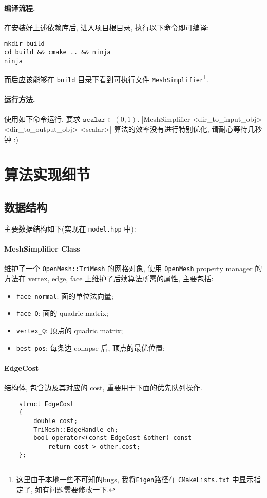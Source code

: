 \documentclass[11pt]{article}
\newcommand\1{\mathds{1}}
\begin{document}
\paragraph{编译流程.} 在安装好上述依赖库后, 进入项目根目录, 执行以下命令即可编译:
\begin{verbatim}
mkdir build
cd build && cmake .. && ninja
ninja 
\end{verbatim}
而后应该能够在 \texttt{build} 目录下看到可执行文件 \texttt{MeshSimplifier}\footnote{这里由于本地一些不可知的bugs, 我将\texttt{Eigen}路径在 \texttt{CMakeLists.txt} 中显示指定了, 如有问题需要修改一下.}.
\paragraph{运行方法.} 使用如下命令运行, 要求 $\texttt{scalar} \in (0,1)$. 
|MeshSimplifier <dir_to_input_obj> <dir_to_output_obj> <scalar>|
算法的效率没有进行特别优化, 请耐心等待几秒钟 :)

\section{算法实现细节}
\subsection{数据结构}
主要数据结构如下(实现在 \texttt{model.hpp} 中): 
\paragraph{MeshSimplifier Class} 维护了一个 \texttt{OpenMesh::TriMesh} 的网格对象, 
使用 \texttt{OpenMesh} property manager 的方法在 vertex, edge, face 上维护了后续算法所需的属性, 主要包括:
\begin{itemize}
    \item \texttt{face\_normal}: 面的单位法向量;
    \item \texttt{face\_Q}: 面的 quadric matrix;
    \item \texttt{vertex\_Q}: 顶点的 quadric matrix;
    \item \texttt{best\_pos}: 每条边 collapse 后, 顶点的最优位置;
\end{itemize}
\paragraph{EdgeCost} 结构体, 包含边及其对应的 cost, 重要用于下面的优先队列操作.
\begin{verbatim}
    struct EdgeCost
    {
        double cost;
        TriMesh::EdgeHandle eh;
        bool operator<(const EdgeCost &other) const
            return cost > other.cost; 
    };
\end{verbatim}
\end{document}
